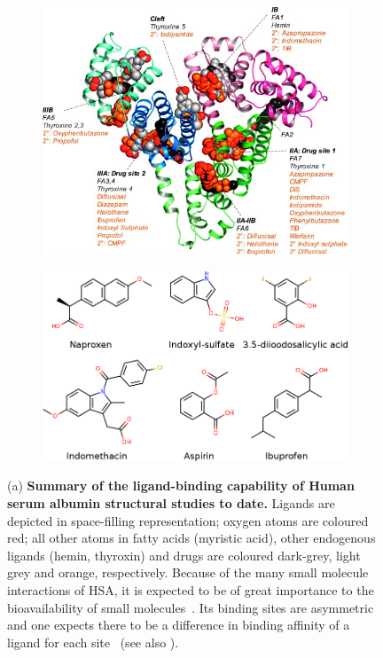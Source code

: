 \documentclass[10pt,final]{article}
\begin{document}
\begin{figure}[H]
\centering
\begin{subfigure}{.49\textwidth}
	\centering
	\includegraphics[width=0.9\linewidth]{figures/hsa_fig7_ghuman2005.jpg}
	\caption{
      }
	\label{figure:albumin}
	\end{subfigure}
	\hfill{}
 	\begin{subfigure}{.49\textwidth}
	  \centering	
	  \includegraphics[width=0.9\linewidth]{figures/hsa_compounds.png}
	  \caption{}
	  \label{figure:hsa-compounds}
 	\end{subfigure}
\caption{(a) \textbf{Summary of the ligand-binding capability of Human serum albumin structural studies to date.} Ligands are depicted in space-filling representation; oxygen atoms are coloured red; all other atoms in fatty acids (myristic acid), other endogenous ligands (hemin, thyroxin) and drugs are coloured dark-grey, light grey and orange, respectively. Because of the many small molecule interactions of HSA, it is expected to be of great importance to the bioavailability of small molecules~\autocite{Metcalfe2010a}. Its binding sites are asymmetric~\autocite{He1992a, Curry1998a} and one expects there to be a difference in binding affinity of a ligand for each site~\autocite{Sudlow1976a} (see also ).
}
\end{figure}
\end{document}
